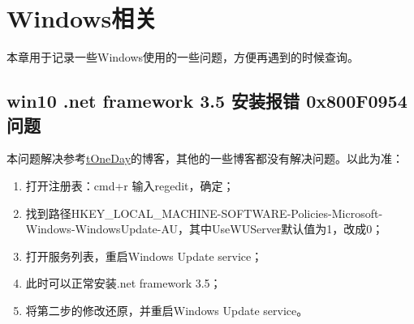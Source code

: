 
\chapter{Windows相关}
本章用于记录一些Windows使用的一些问题，方便再遇到的时候查询。
\section{win10 .net framework 3.5 安装报错 0x800F0954问题}
本问题解决参考\href{https://blog.csdn.net/asd77882566/article/details/80024043}{tOneDay}的博客，其他的一些博客都没有解决问题。以此为准：
\begin{enumerate}
	\item 打开注册表：cmd+r 输入regedit，确定；
	\item 找到路径HKEY\_LOCAL\_MACHINE-SOFTWARE-Policies-Microsoft-Windows-WindowsUpdate-AU，其中UseWUServer默认值为1，改成0；
	\item 打开服务列表，重启Windows Update service；
	\item 此时可以正常安装.net framework 3.5；
	\item 将第二步的修改还原，并重启Windows Update service。
\end{enumerate}